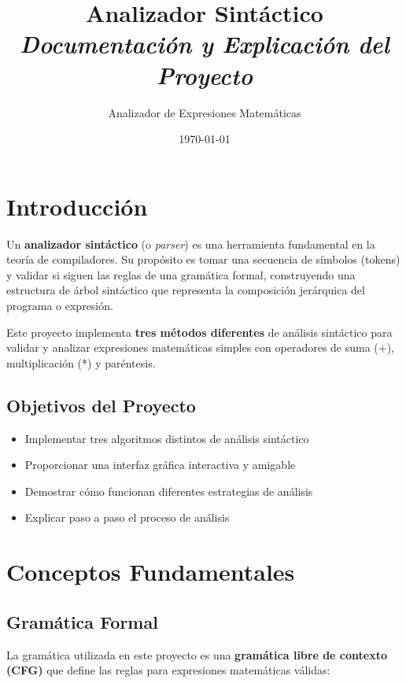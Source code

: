 \documentclass[12pt]{article}
\title{\textbf{Analizador Sintáctico} \\ \textit{Documentación y Explicación del Proyecto}}
\author{Analizador de Expresiones Matemáticas}
\date{\today}
\begin{document}
\maketitle

\newpage
\tableofcontents
\newpage

\section{Introducción}

Un \textbf{analizador sintáctico} (o \textit{parser}) es una herramienta fundamental en la teoría de compiladores. Su propósito es tomar una secuencia de símbolos (tokens) y validar si siguen las reglas de una gramática formal, construyendo una estructura de árbol sintáctico que representa la composición jerárquica del programa o expresión.

Este proyecto implementa \textbf{tres métodos diferentes} de análisis sintáctico para validar y analizar expresiones matemáticas simples con operadores de suma (+), multiplicación (*) y paréntesis.

\subsection{Objetivos del Proyecto}

\begin{itemize}
    \item Implementar tres algoritmos distintos de análisis sintáctico
    \item Proporcionar una interfaz gráfica interactiva y amigable
    \item Demostrar cómo funcionan diferentes estrategias de análisis
    \item Explicar paso a paso el proceso de análisis
\end{itemize}

\section{Conceptos Fundamentales}

\subsection{Gramática Formal}

La gramática utilizada en este proyecto es una \textbf{gramática libre de contexto (CFG)} que define las reglas para expresiones matemáticas válidas:
\end{document}
